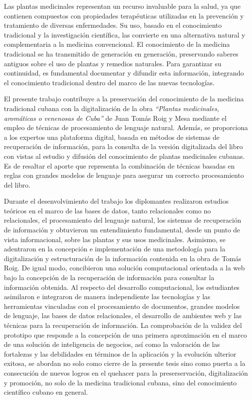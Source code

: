 \begin{opinion}
    Las plantas medicinales representan un recurso invaluable para la salud, ya que contienen compuestos con propiedades terapéuticas utilizadas en la prevención y tratamiento de diversas enfermedades. 
    Su uso, basado en el conocimiento tradicional y la investigación científica, las convierte en una alternativa natural y complementaria a la medicina convencional.
    El conocimiento de la medicina tradicional se ha transmitido de generación en generación, preservando saberes antiguos sobre el uso de plantas y remedios naturales.
    Para garantizar su continuidad, es fundamental documentar y difundir esta información, integrando el conocimiento tradicional dentro del marco de las nuevas tecnologías.
    
    El presente trabajo contribuye a la preservación del conocimiento de la medicina tradicional
    cubana con la digitalización de la obra
    \textit{``Plantas medicinales, aromáticas o venenosas de Cuba''} de Juan Tomás Roig y Mesa
    mediante el empleo de técnicas de procesamiento de lenguaje natural.
    Además, se proporciona a los expertos una plataforma digital, basada en métodos
    de sistemas de recuperación de información, para la consulta de la versión
    digitalizada del libro con vistas al estudio y difusión del conocimiento
    de plantas medicinales cubanas. Es de resaltar el aporte que representa la combinación
    de técnicas basadas en reglas con grandes modelos de lenguaje para asegurar un
    correcto procesamiento del libro.

    Durante el desenvolvimiento del trabajo los diplomantes realizaron estudios
    teóricos en el marco de las bases de datos, tanto relacionales como no relacionales,
    el procesamiento del lenguaje natural, los sistemas de recuperación de información
    y obtuvieron un entendimiento fundamental, desde un punto de vista informacional, sobre
    las plantas y sus usos medicinales. Asimismo, 
    se adentraron en la concepción e implementación de una metodología para
    la digitalización y estructuración de la información contenida en la obra
    de Tomás Roig. De igual modo, concibieron una solución computacional 
    orientada a la web bajo la concepción de la recuperación de información
    para consultar la información obtenida. Al respecto del desarrollo computacional, los estudiantes asimilaron
    e integraron de manera independiente las tecnologías y las herramientas
    vinculadas con el procesamiento de documentos, grandes modelos de lenguaje, 
    las bases de datos relacionales, el desarrollo de
    ambientes web y las técnicas para la recuperación de información. La comprobación de la validez del prototipo que responde a la concepción de una primera aproximación 
    en el marco de
    una solución de inteligencia de negocios, así como la valoración de las fortalezas y las debilidades en términos de la aplicación y la evolución ulterior
    exitosa, se abordan no solo como cierre de la presente tesis sino como puerta
    a la consecución de nuevos logros en el quehacer para la preserservación,
    digitalización y promoción, no solo de la medicina tradicional cubana, sino
    del conocimiento científico cubano en general. 


\end{opinion}
